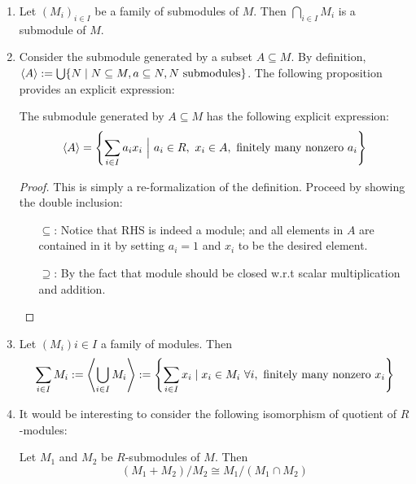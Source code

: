 \documentclass{article}
\begin{document}
\begin{enumerate}
    \item Let $(M_i)_{i\in I}$ be a family of submodules of $M$. Then $\bigcap_{i\in I} M_i$ is a submodule of $M$. 
    \item Consider the submodule generated by a subset $A \subseteq M$. By definition, $\left\langle A \right\rangle := \bigcup\{N \mid N\subseteq M, a\subseteq N, N \text{ submodules}\}$. The following proposition provides an explicit expression:
        \begin{proposition}\label{prop:Explicit Expression of Generated Submodules}
            The submodule generated by $A\subseteq M$ has the following explicit expression:
            \[
                \left\langle A \right\rangle = \left\{ \sum\limits_{i\in I} a_i x_i \ \Big|\  a_i \in R,\ x_i\in A, \text{ finitely many nonzero } a_i \right\}
            \]
        \end{proposition}

        \begin{proof}
            This is simply a re-formalization of the definition. Proceed by showing the double inclusion:
            \begin{itemize}
                \item[$\subseteq$:] Notice that RHS is indeed a module; and all elements in $A$ are contained in it by setting $a_i = 1$ and $x_i$ to be the desired element.
                \item[$\supseteq$:] By the fact that module should be closed w.r.t scalar multiplication and addition.
            \end{itemize}
        \end{proof}
    \item Let $(M_i)i\in I$ a family of modules. Then
        \[
            \sum\limits_{i\in I} M_i := \left\langle \bigcup_{i\in I} M_i \right\rangle := \left\{ \sum\limits_{i\in I} x_i \mid x_i\in M_i\ \forall i, \text{ finitely many nonzero } x_i \right\}
        \]
    \item It would be interesting to consider the following isomorphism of quotient of $R$-modules:
        \begin{theorem}\label{thm:Third Isomorphism Theorem}
            Let $M_1$ and $M_2$ be $R$-submodules of $M$. Then 
            \[
                (M_1 + M_2)/M_2 \cong M_1/(M_1 \cap M_2)  
            \]
         \end{theorem}


\end{enumerate}
\end{document}
